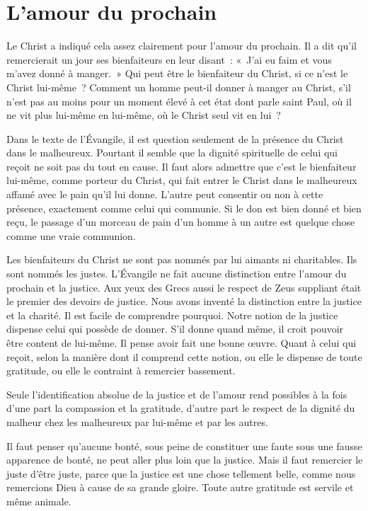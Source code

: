 \documentclass[french,twoside]{book} %
\begin{document}
\section[{L'amour du prochain}]{L'amour du prochain}
\noindent Le Christ a indiqué cela assez clairement pour l'amour du prochain. Il a dit qu'il remercierait un jour ses bienfaiteurs en leur disant : « J'ai eu faim et vous m'avez donné à manger. » Qui peut être le bienfaiteur du Christ, si ce n'est le Christ lui-même ? Comment un homme peut-il donner à manger au Christ, s'il n'est pas au moins pour un moment élevé à cet état dont parle saint Paul, où il ne vit plus lui-même en lui-même, où le Christ seul vit en lui ?\par
Dans le texte de l'Évangile, il est question seulement de la présence du Christ dans le malheureux. Pourtant il semble que la dignité spirituelle de celui qui reçoit ne soit pas du tout en cause. Il faut alors admettre que c'est le bienfaiteur lui-même, comme porteur du Christ, qui fait entrer le Christ dans le malheureux affamé avec le pain qu'il lui donne. L'autre peut consentir ou non à cette présence, exactement comme celui qui communie. Si le don est bien donné et bien reçu, le passage d'un morceau de pain d'un homme à un autre est quelque chose comme une vraie communion.\par
Les bienfaiteurs du Christ ne sont pas nommés par lui aimants ni charitables. Ils sont nommés les justes. L'Évangile ne fait aucune distinction entre l'amour du prochain et la justice. Aux yeux des Grecs aussi le respect de Zeus suppliant était le premier des devoirs de justice. Nous avons inventé la distinction entre la justice et la charité. Il est facile de comprendre pourquoi. Notre notion de la justice dispense celui qui possède de donner. S'il donne quand même, il croit pouvoir être content de lui-même. Il pense avoir fait une bonne œuvre. Quant à celui qui reçoit, selon la manière dont il comprend cette notion, ou elle le dispense de toute gratitude, ou elle le contraint à remercier bassement.\par
Seule l'identification absolue de la justice et de l'amour rend possibles à la fois d'une part la compassion et la gratitude, d'autre part le respect de la dignité du malheur chez les malheureux par lui-même et par les autres.\par
Il faut penser qu'aucune bonté, sous peine de constituer une faute sous une fausse apparence de bonté, ne peut aller plus loin que la justice. Mais il faut remercier le juste d'être juste, parce que la justice est une chose tellement belle, comme nous remercions Dieu à cause de sa grande gloire. Toute autre gratitude est servile et même animale.\par
\end{document}
